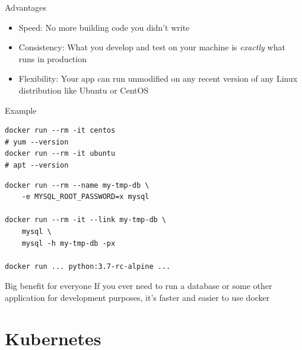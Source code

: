 \documentclass[xcolor=svgnames,17pt]{beamer}
\newcommand*{\sizefont}[1]{%
    \ifcase#1\relax
    \or \tiny
    \or \scriptsize
    \or \footnotesize
    \or \small
    \or \normalsize
    \or \large
    \or \Large
    \or \LARGE
    \or \huge
    \or \Huge
    \fi}
\begin{document}
\begin{frame}{Advantages}
\begin{itemize}
\item Speed: No more building code you didn’t write
\pause
\item Consistency: What you develop and test on your machine is
\textit{exactly} what runs in production
\pause
\item Flexibility: Your app can run unmodified on any recent version of any
Linux distribution like Ubuntu or CentOS
\end{itemize}
\end{frame}

\begin{frame}[fragile]{Example}

\begin{verbatim}
docker run --rm -it centos
# yum --version
docker run --rm -it ubuntu
# apt --version
\end{verbatim}

\pause


\pause

\begin{verbatim}
docker run --rm --name my-tmp-db \
    -e MYSQL_ROOT_PASSWORD=x mysql

docker run --rm -it --link my-tmp-db \
    mysql \
    mysql -h my-tmp-db -px

docker run ... python:3.7-rc-alpine ...

\end{verbatim}

\pause

\end{frame}

\begin{frame}{Big benefit for everyone}
\sizefont{6}
If you ever need to run a database or some other application for
development purposes, it’s faster and easier to use docker
\end{frame}

\section{Kubernetes}
\end{document}

